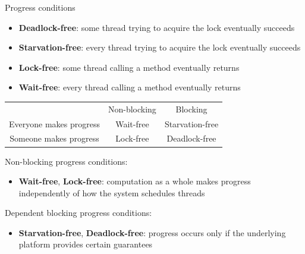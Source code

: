 \begin{frame}[t,noframenumbering]{Progress conditions}

\begin{itemize}

  \item \textbf{Deadlock-free}: some thread trying to acquire the lock eventually succeeds
  \item \textbf{Starvation-free}: every thread trying to acquire the lock eventually succeeds

  \item \textbf{Lock-free}: some thread calling a method eventually returns
  \item \textbf{Wait-free}: every thread calling a method eventually returns
\end{itemize}

\begin{center}
\begin{tabular}{ccc}
                        & Non-blocking & Blocking \\
Everyone makes progress & Wait-free & Starvation-free \\
Someone makes progress  & Lock-free & Deadlock-free 
\end{tabular}
\end{center}

\pause

Non-blocking progress conditions:
\begin{itemize}
  \item \textbf{Wait-free}, \textbf{Lock-free}: computation as a whole makes progress independently of how the system schedules threads
\end{itemize}

\pause

Dependent blocking progress conditions:
\begin{itemize}
  \item \textbf{Starvation-free}, \textbf{Deadlock-free}: progress occurs only if the underlying platform provides certain guarantees
\end{itemize}
\end{frame}

